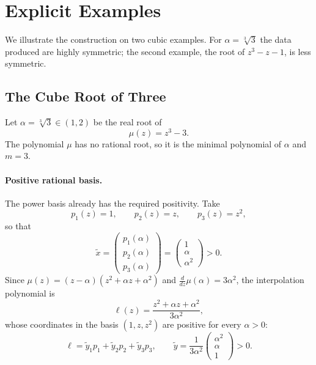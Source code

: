 \documentclass[11pt, a4paper]{article}
\theoremstyle{plain}
\theoremstyle{definition}
\begin{document}
\section{Explicit Examples}\label{sec:example}

We illustrate the construction on two cubic examples. For $\alpha=\sqrt[3]3$ the data produced are highly symmetric; the second example, the root of $z^3-z-1$, is less symmetric.

\subsection{The Cube Root of Three}

Let $\alpha=\sqrt[3]3\in(1,2)$ be the real root of
\[
\mu(z)=z^3-3 .
\]
The polynomial $\mu$ has no rational root, so it is the minimal polynomial of $\alpha$ and $m=3$.

\paragraph{Positive rational basis.}
The power basis already has the required positivity. Take
\[
p_1(z)=1,\qquad p_2(z)=z,\qquad p_3(z)=z^2,
\]
so that
\[
\tilde x=\begin{pmatrix}p_1(\alpha)\\ p_2(\alpha)\\ p_3(\alpha)\end{pmatrix}
=\begin{pmatrix}1\\ \alpha\\ \alpha^2\end{pmatrix}>0 .
\]
Since $\mu(z)=(z-\alpha)(z^2+\alpha z+\alpha^2)$ and $\frac{d}{dz}\mu(\alpha)=3\alpha^2$, the interpolation polynomial is
\[
\ell(z)=\frac{z^2+\alpha z+\alpha^2}{3\alpha^2},
\]
whose coordinates in the basis $(1,z,z^2)$ are positive for every $\alpha>0$:
\[
\ell=\tilde y_1p_1+\tilde y_2p_2+\tilde y_3p_3,
\qquad
\tilde y=\frac1{3\alpha^2}
\begin{pmatrix}
\alpha^2\\[2pt]
\alpha\\[2pt]
1
\end{pmatrix}>0 .
\]
\end{document}
